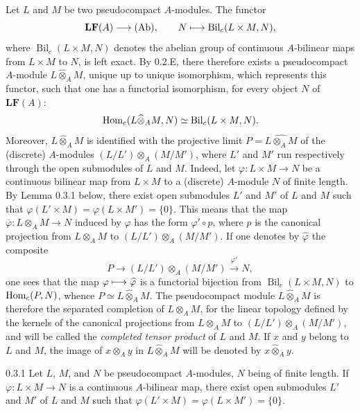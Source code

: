 Let $L$ and $M$ be two pseudocompact $A$-modules. The functor
\[
\mathbf{LF}(A)\longrightarrow\textup{(Ab)},\qquad N\longmapsto\operatorname{Bil}_c(L\times M,N),
\]
where $\operatorname{Bil}_c(L\times M,N)$ denotes the abelian group of continuous $A$-bilinear maps from $L\times M$ to $N$, is left exact.
By 0.2.E, there therefore exists a pseudocompact $A$-module $L\widehat\otimes_A M$, unique up to unique isomorphism, which represents this functor, \ie such that one has a functorial isomorphism, for every object $N$ of $\mathbf{LF}(A)$:
\[
\operatorname{Hom}_c(L\widehat\otimes_A M,N)\simeq\operatorname{Bil}_c(L\times M,N).
\]
Moreover, $L\widehat\otimes_A M$ is identified with the projective limit $P=\widehat{L\otimes_A M}$ of the (discrete) $A$-modules $(L/L')\otimes_A(M/M')$, where $L'$ and $M'$ run respectively through the open submodules of $L$ and $M$.
Indeed, let $\varphi:L\times M\to N$ be a continuous bilinear map from $L\times M$ to a (discrete) $A$-module $N$ of finite length. By Lemma 0.3.1 below, there exist open submodules $L'$ and $M'$ of $L$ and $M$ such that $\varphi(L'\times M)=\varphi(L\times M')=\{0\}$. This means that the map $\overline\varphi:L\otimes_A M\to N$ induced by $\varphi$ has the form $\varphi'\circ p$, where $p$ is the canonical projection from $L\otimes_A M$ to $(L/L')\otimes_A(M/M')$. If one denotes by $\widehat\varphi$ the composite
\[
P\to(L/L')\otimes_A(M/M')\xrightarrow{\varphi'}N,
\]
one sees that the map $\varphi\longmapsto\widehat\varphi$ is a functorial bijection from $\operatorname{Bil}_c(L\times M,N)$ to $\operatorname{Hom}_c(P,N)$, whence $P\simeq L\widehat\otimes_A M$.
The pseudocompact module $L\widehat\otimes_A M$ is therefore the separated completion of $L\otimes_A M$, for the linear topology defined by the kernels of the canonical projections from $L\otimes_A M$ to $(L/L')\otimes_A(M/M')$, and will be called the \emph{completed tensor product} of $L$ and $M$.
If $x$ and $y$ belong to $L$ and $M$, the image of $x\otimes_A y$ in $L\widehat\otimes_A M$ will be denoted by $x\widehat\otimes_A y$.

\begin{lemma}{0.3.1}\label{VIIB.0.3.1}
Let $L$, $M$, and $N$ be pseudocompact $A$-modules, $N$ being of finite length. If $\varphi:L\times M\to N$ is a continuous $A$-bilinear map, there exist open submodules $L'$ and $M'$ of $L$ and $M$ such that $\varphi(L'\times M)=\varphi(L\times M')=\{0\}$.
\end{lemma}
